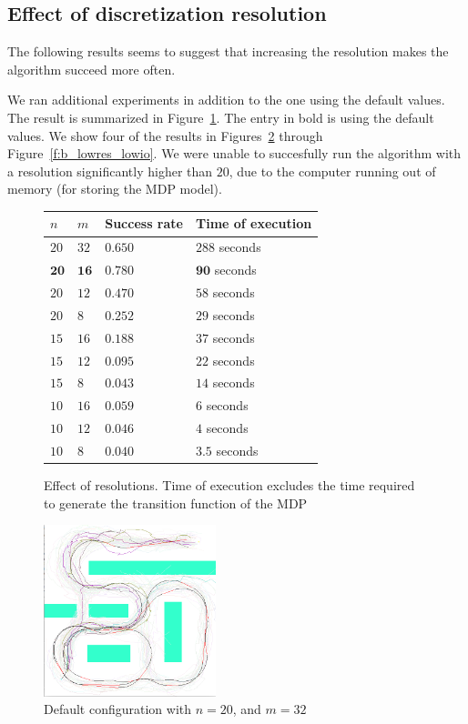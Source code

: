 \documentclass[a4paper]{article}
\begin{document}
\subsection{Effect of discretization resolution}
The following results seems to suggest that increasing the resolution makes the algorithm
succeed more often.

We ran additional experiments in addition to the one using the default
values. The result is summarized in Figure~\ref{f:resolution}.
The entry in bold is using the default values.
We show four of the results in Figures~\ref{f:b_veryhio} through
Figure~\ref{f:b_lowres_lowio}.
We were unable
to succesfully run the algorithm with a resolution significantly higher than
$20$, due to the computer running out of memory (for storing the MDP model).

\begin{figure}
\caption{Effect of resolutions. Time of execution excludes the time required
         to generate the transition function of the MDP}
\label{f:resolution}
\begin{tabular}{ l | l | l | l }
  $n$ & $m$ & Success rate & Time of execution \\ \hline \hline
  $20$ & $32$ & $0.650 $ & $288$ seconds \\ \hline  %
  $\mathbf{20}$ & $\mathbf{16}$ & $\mathbf{0.780}$ & $\mathbf{90}$ seconds \\ \hline
  $20$ & $12$ & $0.470$ & $58$ seconds \\ \hline
  $20$ & $8$ & $0.252$ & $29$ seconds \\ \hline  %

  $15$ & $16$ & $0.188$ & $37$ seconds \\ \hline
  $15$ & $12$ & $0.095$ & $22$ seconds \\ \hline
  $15$ & $8$ & $0.043$ & $14$ seconds \\ \hline

  $10$ & $16$ & $0.059$ & $6$ seconds \\ \hline %
  $10$ & $12$ & $0.046$ & $4$ seconds \\ \hline
  $10$ & $8$ & $0.040$ & $3.5$ seconds \\ \hline %
\end{tabular}
\end{figure}

\begin{figure}
\caption{Default configuration with $n=20$, and $m=32$}
\label{f:b_veryhio}
\centerline{\includegraphics[width=5cm]{b_veryhio.png}}
\end{figure}
\end{document}
